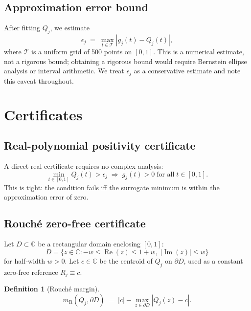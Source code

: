 \documentclass{article}
\theoremstyle{definition}
\newtheorem{definition}{Definition}
\newcommand{\abs}[1]{\left|#1\right|}
\begin{document}
\subsection{Approximation error bound}

After fitting $Q_j$, we estimate
\begin{equation}
  \epsilon_j \;=\; \max_{t\in\mathcal{T}} \abs{g_j(t) - Q_j(t)},
\end{equation}
where $\mathcal{T}$ is a uniform grid of 500 points on $[0,1]$.  This is a
numerical estimate, not a rigorous bound; obtaining a rigorous bound would
require Bernstein ellipse analysis or interval arithmetic.  We treat
$\epsilon_j$ as a conservative estimate and note this caveat throughout.

\section{Certificates}
\label{sec:certs}

\subsection{Real-polynomial positivity certificate}

A direct real certificate requires no complex analysis:
\begin{equation}
  \min_{t\in[0,1]} Q_j(t) > \epsilon_j
  \;\Longrightarrow\; g_j(t) > 0 \;\text{for all}\; t\in[0,1].
\end{equation}
This is tight: the condition fails iff the surrogate minimum is within the
approximation error of zero.

\subsection{Rouch\'e zero-free certificate}

Let $D\subset\mathbb{C}$ be a rectangular domain enclosing $[0,1]$:
\begin{equation}
  D = \{z\in\mathbb{C} : -w \leq \operatorname{Re}(z) \leq 1+w,\;
        \abs{\operatorname{Im}(z)} \leq w\}
\end{equation}
for half-width $w>0$.  Let $c\in\mathbb{C}$ be the centroid of $Q_j$ on
$\partial D$, used as a constant zero-free reference $R_j\equiv c$.

\begin{definition}[Rouch\'e margin]
  \begin{equation}
    m_{\mathrm{R}}(Q_j,\partial D) \;=\; \abs{c} - \max_{z\in\partial D}\abs{Q_j(z)-c}.
    \label{eq:rouche_margin}
  \end{equation}
\end{definition}
\end{document}
